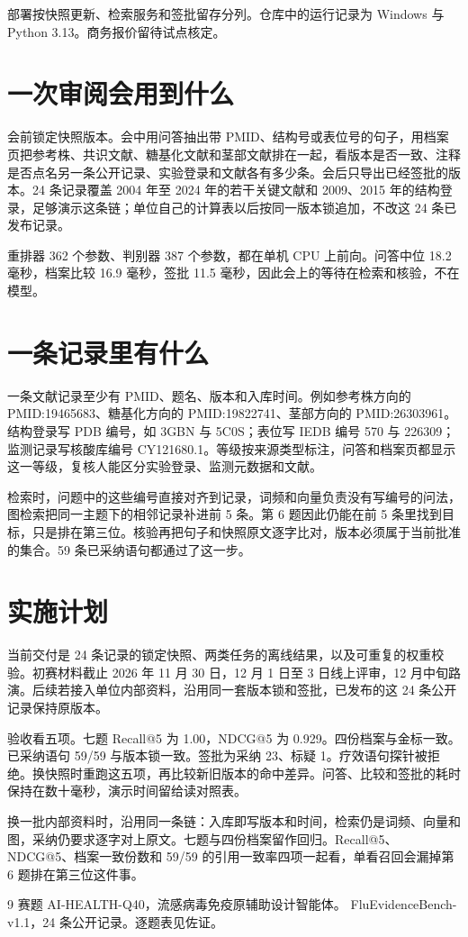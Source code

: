 部署按快照更新、检索服务和签批留存分列。仓库中的运行记录为 Windows 与 Python 3.13。商务报价留待试点核定。

\section{一次审阅会用到什么}
会前锁定快照版本。会中用问答抽出带 PMID、结构号或表位号的句子，用档案页把参考株、共识文献、糖基化文献和茎部文献排在一起，看版本是否一致、注释是否点名另一条公开记录、实验登录和文献各有多少条。会后只导出已经签批的版本。24 条记录覆盖 2004 年至 2024 年的若干关键文献和 2009、2015 年的结构登录，足够演示这条链；单位自己的计算表以后按同一版本锁追加，不改这 24 条已发布记录。

重排器 362 个参数、判别器 387 个参数，都在单机 CPU 上前向。问答中位 18.2 毫秒，档案比较 16.9 毫秒，签批 11.5 毫秒，因此会上的等待在检索和核验，不在模型。

\section{一条记录里有什么}
一条文献记录至少有 PMID、题名、版本和入库时间。例如参考株方向的 PMID:19465683、糖基化方向的 PMID:19822741、茎部方向的 PMID:26303961。结构登录写 PDB 编号，如 3GBN 与 5C0S；表位写 IEDB 编号 570 与 226309；监测记录写核酸库编号 CY121680.1。等级按来源类型标注，问答和档案页都显示这一等级，复核人能区分实验登录、监测元数据和文献。

检索时，问题中的这些编号直接对齐到记录，词频和向量负责没有写编号的问法，图检索把同一主题下的相邻记录补进前 5 条。第 6 题因此仍能在前 5 条里找到目标，只是排在第三位。核验再把句子和快照原文逐字比对，版本必须属于当前批准的集合。59 条已采纳语句都通过了这一步。

\clearpage
\section{实施计划}
当前交付是 24 条记录的锁定快照、两类任务的离线结果，以及可重复的权重校验。初赛材料截止 2026 年 11 月 30 日，12 月 1 日至 3 日线上评审，12 月中旬路演。后续若接入单位内部资料，沿用同一套版本锁和签批，已发布的这 24 条公开记录保持原版本。

验收看五项。七题 Recall@5 为 1.00，NDCG@5 为 0.929。四份档案与金标一致。已采纳语句 59/59 与版本锁一致。签批为采纳 23、标疑 1。疗效语句探针被拒绝。换快照时重跑这五项，再比较新旧版本的命中差异。问答、比较和签批的耗时保持在数十毫秒，演示时间留给读对照表。

换一批内部资料时，沿用同一条链：入库即写版本和时间，检索仍是词频、向量和图，采纳仍要求逐字对上原文。七题与四份档案留作回归。Recall@5、NDCG@5、档案一致份数和 59/59 的引用一致率四项一起看，单看召回会漏掉第 6 题排在第三位这件事。

\begin{thebibliography}{9}
 赛题 AI-HEALTH-Q40，流感病毒免疫原辅助设计智能体。
 FluEvidenceBench-v1.1，24 条公开记录。逐题表见佐证。
\end{thebibliography}

